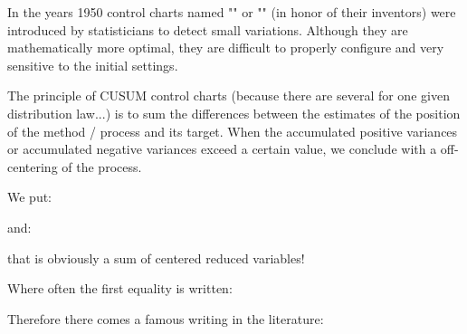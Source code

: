 	In the years 1950 control charts named "" or "" (in honor of their inventors) were introduced by statisticians to detect small variations. Although they are mathematically more optimal, they are difficult to properly configure and very sensitive to the initial settings.

	The principle of CUSUM control charts (because there are several for one given distribution law...) is to sum the differences between the estimates of the position of the method / process and its target. When the accumulated positive variances or accumulated negative variances exceed a certain value, we conclude with a off-centering of the process.
	
	We put:
	
	and:
	
	that is obviously a sum of centered reduced variables!
	
	Where often the first equality is written:
	
	Therefore there comes a famous writing in the literature:
	
